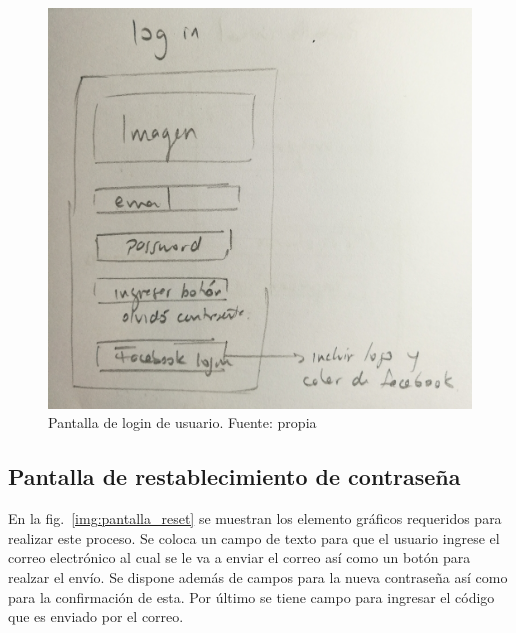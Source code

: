 \documentclass[12pt,letterpaper]{article}
\begin{document}
\begin{figure}[h!]
	\begin{center}
		\includegraphics[scale=0.07]{pantalla_login.jpg}
		\caption{Pantalla de login de usuario. Fuente: propia}
		\label{img:pantalla_login}
	\end{center}
\end{figure}

\subsection{Pantalla de restablecimiento de contraseña}
En la fig.~\ref{img:pantalla_reset} se muestran los elemento gráficos requeridos para realizar este proceso. Se coloca un campo de texto para que el usuario ingrese el correo electrónico al cual se le va a enviar el correo así como un botón para realzar el envío. Se dispone además de campos para la nueva contraseña así como para la confirmación de esta. Por último se tiene campo para ingresar el código que es enviado por el correo.
\end{document}
